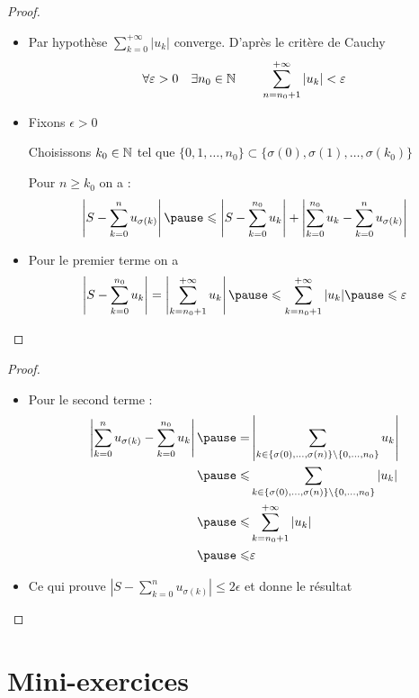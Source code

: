 \begin{frame}
\begin{proof}
\begin{itemize}
\item Par hypothèse $\sum_{k=0}^{+\infty} |u_k|$ converge. \pause 
D'après le critère de Cauchy
$$\forall \varepsilon>0\quad \exists n_0\in\mathbb{N} \qquad \sum_{n=n_0+1}^{+\infty} |u_k|<\varepsilon$$
\item\pause Fixons $\epsilon>0$

Choisissons $k_0\in\mathbb{N}$ tel que 
$\big\{0, 1,\dots,n_0\big\} \subset \big\{\sigma(0),\sigma(1),\ldots, \sigma(k_0)\big\}$

\pause
Pour $n\geq k_0$ on a :
$$
\left|S-\sum_{k=0}^n u_{\sigma(k)}\right| 
\pause \le \left|S-\sum_{k=0}^{n_0} u_k\right|+\left|\sum_{k=0}^{n_0} u_k- 
\sum_{k=0}^n u_{\sigma(k)}\right|
$$
\item\pause Pour le premier terme on a 
$$\left|S-\sum_{k=0}^{n_0} u_k\right| = \left| \sum_{k=n_0+1}^{+\infty} u_k\right| 
\pause \le \sum_{k=n_0+1}^{+\infty} |u_k|
\pause \le \epsilon$$
\noqed\qedhere
\end{itemize}
\end{proof}
\end{frame}

\begin{frame}
\begin{proof}
\begin{itemize}
\item Pour le second terme :
\begin{eqnarray*}
\left|\sum_{k=0}^n u_{\sigma(k)}-\sum_{k=0}^{n_0} u_k\right|
\pause =& \left|\displaystyle\sum_{k \in \{\sigma(0),\ldots,\sigma(n)\}\setminus\{0,\ldots,n_0\}} u_k \right| \\
\pause  \le& \displaystyle\sum_{k \in \{\sigma(0),\ldots,\sigma(n)\}\setminus\{0,\ldots,n_0\}} |u_k| \\
\pause \le &\displaystyle\sum_{k=n_0+1}^{+\infty} |u_k| \\
\pause \le &\epsilon
\end{eqnarray*}
\item\pause Ce qui prouve $\left|S-\sum_{k=0}^n u_{\sigma(k)}\right| \le 2\epsilon$ et donne le résultat
\qedhere
\end{itemize}
\end{proof}
\end{frame}


\section{Mini-exercices}

